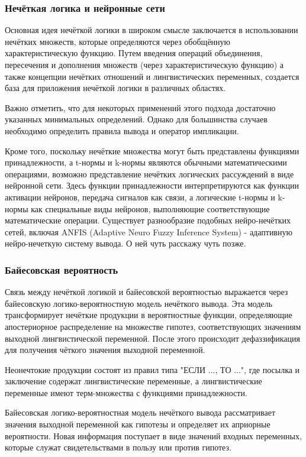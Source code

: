 \subsubsection{Нечёткая логика и нейронные сети}
Основная идея нечёткой логики в широком смысле заключается в использовании нечётких множеств, которые определяются через обобщённую характеристическую функцию. Путем введения операций объединения, пересечения и дополнения множеств (через характеристическую функцию) а также концепции нечётких отношений и лингвистических переменных, создается база для приложения нечёткой логики в различных областях.

Важно отметить, что для некоторых применений этого подхода достаточно указанных минимальных определений. Однако для большинства случаев необходимо определить правила вывода и оператор импликации.

Кроме того, поскольку нечёткие множества могут быть представлены функциями принадлежности, а t-нормы и k-нормы являются обычными математическими операциями, возможно представление нечётких логических рассуждений в виде нейронной сети. Здесь функции принадлежности интерпретируются как функции активации нейронов, передача сигналов как связи, а логические t-нормы и k-нормы как специальные виды нейронов, выполняющие соответствующие математические операции. Существует разнообразие подобных нейро-нечётких сетей, включая ANFIS (Adaptive Neuro Fuzzy Inference System) - адаптивную нейро-нечеткую систему вывода. О ней чуть расскажу чуть позже.

\subsubsection{Байесовская вероятность}
Связь между нечёткой логикой и байесовской вероятностью выражается через байесовскую логико-вероятностную модель нечёткого вывода. Эта модель трансформирует нечёткие продукции в вероятностные функции, определяющие апостериорное распределение на множестве гипотез, соответствующих значениям выходной лингвистической переменной. После этого происходит дефаззификация для получения чёткого значения выходной переменной.

Неонечтокие продукции состоят из правил типа "ЕСЛИ ..., ТО ...", где посылка и заключение содержат лингвистические переменные, а лингвистические переменные имеют терм-множества с функциями принадлежности.

Байесовская логико-вероятностная модель нечёткого вывода рассматривает значения выходной переменной как гипотезы и определяет их априорные вероятности. Новая информация поступает в виде значений входных переменных, которые служат свидетельствами в пользу или против гипотез.

